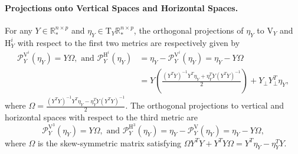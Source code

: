 \documentclass[11pt]{article}
\numberwithin{equation}{section}
\begin{document}
\paragraph{Projections onto Vertical Spaces and Horizontal Spaces.} 
For any $Y\in \mathbb{R}_*^{n\times p}$ and $\eta_Y\in \mathrm{T}_Y\mathbb{R}_*^{n\times p}$, the orthogonal projections of $\eta_Y$ to $\mathrm{V}_Y$ and $\mathrm{H}_Y^i$ with respect to the first two metrics are respectively given by
	$$
	\begin{aligned} 
	\mathcal{P}_Y^{\mathrm{V}^i}(\eta_Y) = Y\Omega, \text{ and } \mathcal{P}_Y^{\mathrm{H}^i}(\eta_Y)&=\eta_Y-\mathcal{P}_Y^{\mathrm{V}^{i}}(\eta_Y)=\eta_Y-Y\Omega \\ &= Y\left( \frac{(Y^TY)^{-1}Y^T\eta_Y+\eta_Y^TY(Y^TY)^{-1}}{2} \right) + Y_\perp Y_\perp^T\eta_Y, 
    \end{aligned}
	$$
	where $\Omega = \frac{(Y^TY)^{-1}Y^T\eta_Y-\eta_Y^TY(Y^TY)^{-1}}{2}$. The orthogonal projections to vertical and horizontal spaces with respect to the third metric are 
    $$ 
    \mathcal{P}_Y^{\mathrm{V}^3}(\eta_Y)=Y\Omega, \text{ and } \mathcal{P}_Y^{\mathrm{H}^3}(\eta_Y)=\eta_Y-\mathcal{P}_Y^{\mathrm{V}}(\eta_Y)=\eta_Y-Y\Omega,
    $$
    where $\Omega$ is the skew-symmetric matrix satisfying $ \Omega Y^TY +Y^TY\Omega=Y^T\eta_Y-\eta^T_YY.$




\end{document}
